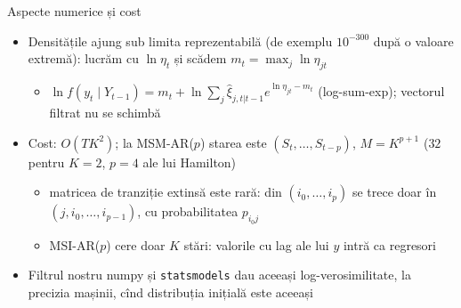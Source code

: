 \begin{frame}{Aspecte numerice și cost}
\itemsize{\small}
\begin{itemize}
    \item Densitățile ajung sub limita reprezentabilă (de exemplu $10^{-300}$ după o valoare extremă): lucrăm cu $\ln\eta_t$ și scădem $m_t = \max_j \ln\eta_{jt}$
    \begin{itemize}
        \item $\ln f(y_t \mid Y_{t-1}) = m_t + \ln\sum_j \hat\xi_{j,t|t-1}e^{\ln\eta_{jt} - m_t}$ (log-sum-exp); vectorul filtrat nu se schimbă
    \end{itemize}
    \item Cost: $O(TK^2)$; la MSM-AR($p$) starea este $(S_t, \dots, S_{t-p})$, $M = K^{p+1}$ ($32$ pentru $K = 2$, $p = 4$ ale lui Hamilton)
    \begin{itemize}
        \item matricea de tranziție extinsă este rară: din $(i_0, \dots, i_p)$ se trece doar în $(j, i_0, \dots, i_{p-1})$, cu probabilitatea $p_{i_0 j}$
        \item MSI-AR($p$) cere doar $K$ stări: valorile cu lag ale lui $y$ intră ca regresori
    \end{itemize}
    \item Filtrul nostru numpy și \texttt{statsmodels} dau aceeași log-verosimilitate, la precizia mașinii, cînd distribuția inițială este aceeași
\end{itemize}
\end{frame}

